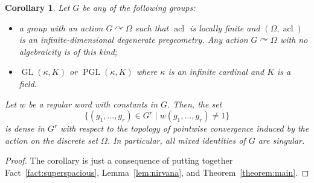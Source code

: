 \documentclass{article}
\newtheorem{corollary}[theorem]{Corollary}
\theoremstyle{remark}
\theoremstyle{definition}
\def\acts{\curvearrowright}
\newcommand{\remmic}[1]{\textcolor{orange}{MP: #1}}
\DeclareMathOperator{\acl}{acl}
\DeclareMathOperator{\GL}{GL}
\DeclareMathOperator{\PGL}{PGL}
\begin{document}
{\begin{corollary}\label{cor:main} Let $G$ be any of the following groups:
\begin{itemize}
    \item a group {with an action} $G\acts\Omega$ such that $\acl$ is locally finite and  $(\Omega, \acl)$ is an infinite-dimensional degenerate pregeometry.
   Any action $G\acts\Omega$ with no algebraicity is of this kind;
    \item $\GL(\kappa, K)$ or $\PGL(\kappa, K)$ where $\kappa$ is an infinite cardinal and $K$ is a field. 
\end{itemize}
Let $w$ be a 
regular word with constants in $G$. Then, the set
\[\{(g_1, \dots, g_r)\in G^r\;\vert\; w(g_1, \dots, g_r)\neq 1\}\]
  is dense in $G^r$ {with respect to the topology of pointwise convergence induced by the action on the discrete set $\Omega$}. 
In particular, all mixed identities of $G$ are singular.
\end{corollary}
\begin{proof} The corollary is just a consequence of putting together Fact~\ref{fact:superspacious}, Lemma~\ref{lem:nirvana}, and Theorem~\ref{theorem:main}.
\end{proof}


}
\end{document}
